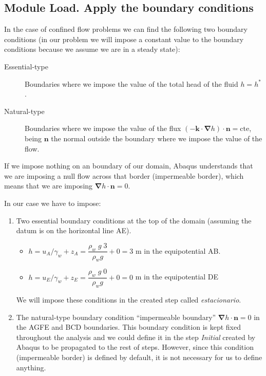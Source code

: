  \subsection{Module Load. Apply the boundary conditions}

  In the case of confined flow problems we can find the following two
  boundary conditions (in our problem we will impose a constant value
  to the boundary conditions because we assume we are in a steady
  state):
  \begin{description}
  \item[Essential-type] Boundaries where we impose the value of the
    total head of the fluid $h=h^*$.
  \item[Natural-type] Boundaries where we impose the value of the flux
    $(-\textbf{k}\cdot\bm{\nabla}h)\cdot\textbf{n}=\mathrm{cte}$,
    being $\textbf{n}$ the normal outside the boundary where we impose
    the value of the flow.
  \end{description}

  If we impose nothing on an boundary of our domain, Abaqus
  understands that we are imposing a null flow across that border
  (impermeable border), which means that we are imposing
  $ \bm{\nabla}h\cdot\textbf{n}=0$.

  In our case we have to impose:
  \begin{enumerate}
  \item Two essential boundary conditions at the top of the domain
    (assuming the datum is on the horizontal line AE).
    \begin{itemize}
    \item $h=u_A/\gamma_w+z_A=\dfrac{\rho_w\; g\; 3}{\rho_w g}+0 = 3$
      m in the equipotential AB.
    \item $h=u_E/\gamma_w+z_E= \dfrac{\rho_w\; g\; 0}{\rho_w g}+0=0$ m
      in the equipotential DE
    \end{itemize}
    We will impose these conditions in the created step called
    \textit{estacionario}.
  \item The natural-type boundary condition ``impermeable boundary''
    $\bm{\nabla}h \cdot \textbf{n} = 0 $ in the AGFE and BCD
    boundaries. This boundary condition is kept fixed throughout the
    analysis and we could define it in the step \textit{Initial}
    created by Abaqus to be propagated to the rest of steps. However,
    since this condition (impermeable border) is defined by default,
    it is not necessary for us to define anything.
  \end{enumerate}

